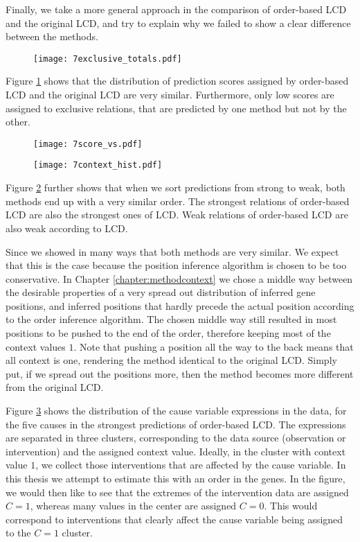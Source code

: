 Finally, we take a more general approach in the comparison of order-based LCD and the original LCD, and try to explain why we failed to show a clear difference between the methods. 

\begin{figure}[h]
    \centering
    \texttt{[image: 7exclusive\_totals.pdf]}
    \caption{}
    \label{fig:7:excltotals}
\end{figure}

Figure \ref{fig:7:excltotals} shows that the distribution of prediction scores assigned by order-based LCD and the original LCD are very similar. Furthermore, only low scores are assigned to exclusive relations, that are predicted by one method but not by the other. 

\begin{figure}[h]
    \centering
    \texttt{[image: 7score\_vs.pdf]}
    \caption{}
    \label{fig:7:scorevs}
\end{figure}

\begin{figure}[h]
    \centering
    \texttt{[image: 7context\_hist.pdf]}
    \caption{}
    \label{fig:7:contexthist}
\end{figure}

Figure \ref{fig:7:scorevs} further shows that when we sort predictions from strong to weak, both methods end up with a very similar order. The strongest relations of order-based LCD are also the strongest ones of LCD. Weak relations of order-based LCD are also weak according to LCD. 

Since we showed in many ways that both methods are very similar. We expect that this is the case because the position inference algorithm is chosen to be too conservative. In Chapter \ref{chapter:methodcontext} we chose a middle way between the desirable properties of a very spread out distribution of inferred gene positions, and inferred positions that hardly precede the actual position according to the order inference algorithm. The chosen middle way still resulted in most positions to be pushed to the end of the order, therefore keeping most of the context values $1$. Note that pushing a position all the way to the back means that all context is one, rendering the method identical to the original LCD. Simply put, if we spread out the positions more, then the method becomes more different from the original LCD. 

Figure \ref{fig:7:contexthist} shows the distribution of the cause variable expressions in the data, for the five causes in the strongest predictions of order-based LCD. The expressions are separated in three clusters, corresponding to the data source (observation or intervention) and the assigned context value. Ideally, in the cluster with context value $1$, we collect those interventions that are affected by the cause variable. In this thesis we attempt to estimate this with an order in the genes. In the figure, we would then like to see that the extremes of the intervention data are assigned $C=1$, whereas many values in the center are assigned $C=0$. This would correspond to interventions that clearly affect the cause variable being assigned to the $C=1$ cluster. 

